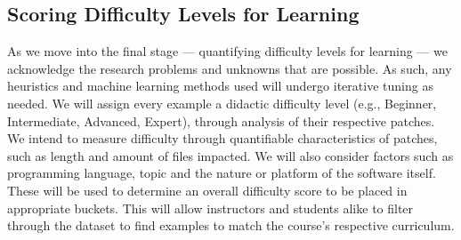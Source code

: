 \subsection{Scoring Difficulty Levels for Learning}
As we move into the final stage — quantifying difficulty levels for learning — we acknowledge the research problems and unknowns that are possible. As such, any heuristics and machine learning methods used will undergo iterative tuning as needed. We will assign every example a didactic difficulty level (e.g., Beginner, Intermediate, Advanced, Expert), through analysis of their respective patches. We intend to measure difficulty through quantifiable characteristics of patches, such as length and amount of files impacted. We will also consider factors such as programming language, topic and the nature or platform of the software itself. These will be used to determine an overall difficulty score to be placed in appropriate buckets. This will allow instructors and students alike to filter through the dataset to find examples to match the course's respective curriculum.
